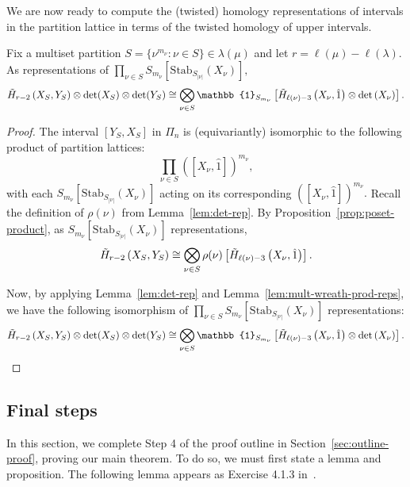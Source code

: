 \documentclass[ALCO, Unicode]{cedram}
\def\stab{\mathrm{Stab}}
\begin{document}
We are now ready to compute the (twisted) homology representations of intervals in the partition lattice in terms of the twisted homology of upper intervals. 
\begin{lemma}\label{prop:homology-of-intervals.}
  Fix a multiset partition $S = \{\nu^{m_\nu}: \nu \in S\} \in \lambda(\mu)$ and let $r = \ell(\mu) - \ell(\lambda).$ As representations of $\prod_{\nu \in S}S_{m_\nu}[\stab_{S_{|\nu|}}(X_\nu)],$ 
    \begin{align*}
        \Tilde{H}_{r - 2}\left(X_S, Y_S\right) \otimes \det(X_S) \otimes \det(Y_S) \cong \bigotimes_{\nu \in S} \mathbb{1}_{S_{m_\nu}} \left[ \Tilde{H}_{\ell(\nu) - 3} \left( X_\nu, \hat{1} \right) \otimes \det\left(X_\nu\right) \right].
    \end{align*}
\end{lemma}
\begin{proof}
    The interval $[Y_S, X_S]$ in $\Pi_n$ is (equivariantly) isomorphic to the following product of partition lattices: \[\prod_{\nu \in S}\left( [X_\nu, \hat{1}]\right)^{m_\nu},\]
with each $S_{m_\nu}[\stab_{S_{|\nu|}}(X_\nu)]$ acting on its corresponding $\left( [X_\nu, \hat{1}]\right)^{m_\nu}.$ Recall the definition of $\rho(\nu)$ from Lemma~\ref{lem:det-rep}. By Proposition~\ref{prop:poset-product}, as $S_{m_\nu}\left[\stab_{S_{|\nu|}}\left(X_\nu\right)\right]$ representations, 
\begin{align*}
    \Tilde{H}_{r - 2} \left(X_S, Y_S\right) \cong \bigotimes_{\nu \in S} \rho(\nu) \left[\Tilde{H}_{\ell(\nu) - 3}\left(X_\nu, \hat{1}\right)\right].
\end{align*}

Now, by applying Lemma~\ref{lem:det-rep} and Lemma~\ref{lem:mult-wreath-prod-reps}, we have the following isomorphism of $\prod_{\nu \in S}S_{m_\nu}[\stab_{S_{|\nu|}}(X_\nu)]$ representations:
\begin{align*}
\Tilde{H}_{r - 2}\left(X_S, Y_S\right) \otimes \det(X_S) \otimes \det(Y_S) \cong \bigotimes_{\nu \in S}\mathbb{1}_{S_{m_\nu}} \left[ \Tilde{H}_{\ell(\nu) - 3} \left( X_\nu, \hat{1} \right) \otimes \det\left(X_\nu\right) \right].
\end{align*}
\end{proof}
\subsection{Final steps}\label{subsec:final-step}
In this section, we complete Step 4 of the proof outline in Section~\ref{sec:outline-proof}, proving our main theorem. To do so, we must first state a lemma and proposition. The following lemma appears as Exercise 4.1.3 in~\cite{Grinberg--Reiner}.
\end{document}
